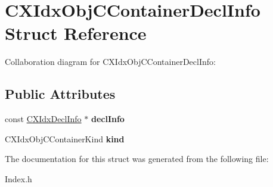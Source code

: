 \hypertarget{structCXIdxObjCContainerDeclInfo}{}\section{C\+X\+Idx\+Obj\+C\+Container\+Decl\+Info Struct Reference}
\label{structCXIdxObjCContainerDeclInfo}


Collaboration diagram for C\+X\+Idx\+Obj\+C\+Container\+Decl\+Info\+:
\subsection*{Public Attributes}
\begin{DoxyCompactItemize}
\item 
\mbox{\label{structCXIdxObjCContainerDeclInfo_a39f1c681d756288deadf52798a6551a2}} 
const \hyperlink{structCXIdxDeclInfo}{C\+X\+Idx\+Decl\+Info} $\ast$ {\bfseries decl\+Info}
\item 
\mbox{\label{structCXIdxObjCContainerDeclInfo_ab497c7753b2df0bf8d88dbfd612c6eae}} 
C\+X\+Idx\+Obj\+C\+Container\+Kind {\bfseries kind}
\end{DoxyCompactItemize}


The documentation for this struct was generated from the following file\+:\begin{DoxyCompactItemize}
\item 
Index.\+h\end{DoxyCompactItemize}
